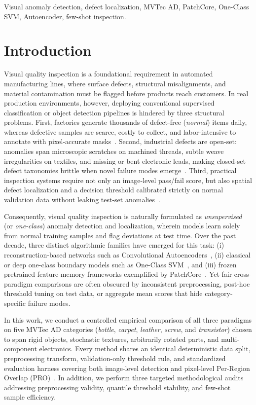 \documentclass[conference]{IEEEtran}
\begin{document}
\begin{IEEEkeywords}
Visual anomaly detection, defect localization, MVTec AD, PatchCore, One-Class SVM, Autoencoder, few-shot inspection.
\end{IEEEkeywords}

\section{Introduction}
Visual quality inspection is a foundational requirement in automated manufacturing lines, where surface defects, structural misalignments, and material contamination must be flagged before products reach customers. In real production environments, however, deploying conventional supervised classification or object detection pipelines is hindered by three structural problems. First, factories generate thousands of defect-free (\textit{normal}) items daily, whereas defective samples are scarce, costly to collect, and labor-intensive to annotate with pixel-accurate masks~\cite{bergmann2019mvtec,bergmann2021mvtec}. Second, industrial defects are open-set: anomalies span microscopic scratches on machined threads, subtle weave irregularities on textiles, and missing or bent electronic leads, making closed-set defect taxonomies brittle when novel failure modes emerge~\cite{zou2022spot}. Third, practical inspection systems require not only an image-level pass/fail score, but also spatial defect localization and a decision threshold calibrated strictly on normal validation data without leaking test-set anomalies~\cite{roth2022towards}.

Consequently, visual quality inspection is naturally formulated as \textit{unsupervised} (or \textit{one-class}) anomaly detection and localization, wherein models learn solely from normal training samples and flag deviations at test time. Over the past decade, three distinct algorithmic families have emerged for this task: (i) reconstruction-based networks such as Convolutional Autoencoders~\cite{bergmann2019ssim}, (ii) classical or deep one-class boundary models such as One-Class SVM~\cite{scholkopf2001estimating,ruff2018deep}, and (iii) frozen pretrained feature-memory frameworks exemplified by PatchCore~\cite{roth2022towards}. Yet fair cross-paradigm comparisons are often obscured by inconsistent preprocessing, post-hoc threshold tuning on test data, or aggregate mean scores that hide category-specific failure modes.

In this work, we conduct a controlled empirical comparison of all three paradigms on five MVTec AD categories (\textit{bottle}, \textit{carpet}, \textit{leather}, \textit{screw}, and \textit{transistor}) chosen to span rigid objects, stochastic textures, arbitrarily rotated parts, and multi-component electronics. Every method shares an identical deterministic data split, preprocessing transform, validation-only threshold rule, and standardized evaluation harness covering both image-level detection and pixel-level Per-Region Overlap (PRO)~\cite{bergmann2021mvtec}. In addition, we perform three targeted methodological audits addressing preprocessing validity, quantile threshold stability, and few-shot sample efficiency.
\end{document}
